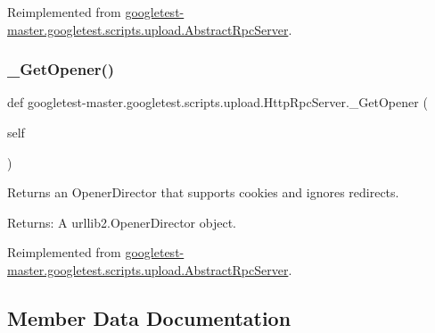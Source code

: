Reimplemented from \mbox{\hyperlink{classgoogletest-master_1_1googletest_1_1scripts_1_1upload_1_1_abstract_rpc_server_ae2d84f4ca4955d9bf1460531748fa432}{googletest-\/master.\+googletest.\+scripts.\+upload.\+Abstract\+Rpc\+Server}}.

\mbox{\label{classgoogletest-master_1_1googletest_1_1scripts_1_1upload_1_1_http_rpc_server_a32e41ee17da48e04087afd61fc451c74}} 
\subsubsection{\texorpdfstring{\_GetOpener()}{\_GetOpener()}}
{\footnotesize\ttfamily def googletest-\/master.\+googletest.\+scripts.\+upload.\+Http\+Rpc\+Server.\+\_\+\+Get\+Opener (\begin{DoxyParamCaption}\item[{}]{self }\end{DoxyParamCaption})\hspace{0.3cm}{\ttfamily [private]}}

\begin{DoxyVerb}Returns an OpenerDirector that supports cookies and ignores redirects.

Returns:
  A urllib2.OpenerDirector object.
\end{DoxyVerb}
 

Reimplemented from \mbox{\hyperlink{classgoogletest-master_1_1googletest_1_1scripts_1_1upload_1_1_abstract_rpc_server_a6062a1fe65aa19d8b4ed86e34eabbf95}{googletest-\/master.\+googletest.\+scripts.\+upload.\+Abstract\+Rpc\+Server}}.



\subsection{Member Data Documentation}
\mbox{\label{classgoogletest-master_1_1googletest_1_1scripts_1_1upload_1_1_http_rpc_server_af5bca2805562c5627585c537fb7ad262}} 

